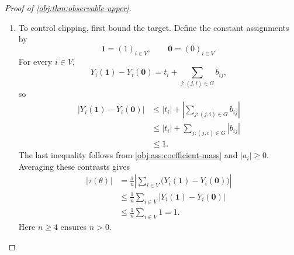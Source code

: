 \documentclass[11pt]{article}
\begin{document}
\begin{proof}[Proof of \cref{obj:thm:observable-upper}]
\begin{enumerate}
For each \(i\in V\) and binary assignment \(z\in\{0,1\}^V\), the additive outcome formula and coefficient-mass bound give
\[
\begin{aligned}
|Y_i(z)|
&=
\left|a_i+t_i z_i+\sum_{j:(j,i)\in G}b_{ij}z_j\right|\\
&\le
|a_i|+|t_i z_i|
+\sum_{j:(j,i)\in G}|b_{ij}z_j|\\
&\le
|a_i|+|t_i|
+\sum_{j:(j,i)\in G}|b_{ij}|\\
&\le1,
\end{aligned}
\]
where the penultimate inequality uses \(z_j\in\{0,1\}\), and the last uses \cref{obj:ass:coefficient-mass}. Consequently,
\[
\mathbb E_Z[Y_i(Z)^2]\le\mathbb E_Z[1]=1.
\]
The in-degree bound therefore yields
\[
\begin{aligned}
\sum_{i\in V}
\bigl|\{j:(j,i)\in G\}\bigr|
\,\mathbb E_Z[Y_i(Z)^2]
&\le
\sum_{i\in V}\bigl|\{j:(j,i)\in G\}\bigr|\\
&\le\sum_{i\in V}d
=nd.
\end{aligned}
\]
Since \(n>0\), \(q>0\), and \(q\le1\),
\[
\frac{4(1-q)}{n^2q}\ge0.
\]
Combining the preceding bounds gives
\[
\begin{aligned}
\mathbb E_{P_{\theta,q}}
\left[(T_q-\tau(\theta))^2\right]
&\le
\frac{5(d+1)^2}{n}
+\frac{4(1-q)}{n^2q}\,nd\\
&=
\frac{5(d+1)^2}{n}
+\frac{4d(1-q)}{nq}
=u(n,d,q).
\end{aligned}
\]
All expectations here are integrable because the assignment--audit space is finite.

\item
To control clipping, first bound the target. Define the constant assignments by
\[
\mathbf1=(1)_{i\in V},
\qquad
\mathbf0=(0)_{i\in V}.
\]
For every \(i\in V\),
\[
Y_i(\mathbf1)-Y_i(\mathbf0)
=t_i+\sum_{j:(j,i)\in G}b_{ij},
\]
so
\[
\begin{aligned}
|Y_i(\mathbf1)-Y_i(\mathbf0)|
&\le |t_i|+
\left|\sum_{j:(j,i)\in G}b_{ij}\right|\\
&\le |t_i|+\sum_{j:(j,i)\in G}|b_{ij}|\\
&\le1.
\end{aligned}
\]
The last inequality follows from \cref{obj:ass:coefficient-mass} and \(|a_i|\ge0\). Averaging these contrasts gives
\[
\begin{aligned}
|\tau(\theta)|
&=
\frac1n
\left|\sum_{i\in V}
\bigl(Y_i(\mathbf1)-Y_i(\mathbf0)\bigr)\right|\\
&\le
\frac1n\sum_{i\in V}
|Y_i(\mathbf1)-Y_i(\mathbf0)|\\
&\le\frac1n\sum_{i\in V}1
=1.
\end{aligned}
\]
Here \(n\ge4\) ensures \(n>0\).


\end{enumerate}
\end{proof}
\end{document}
